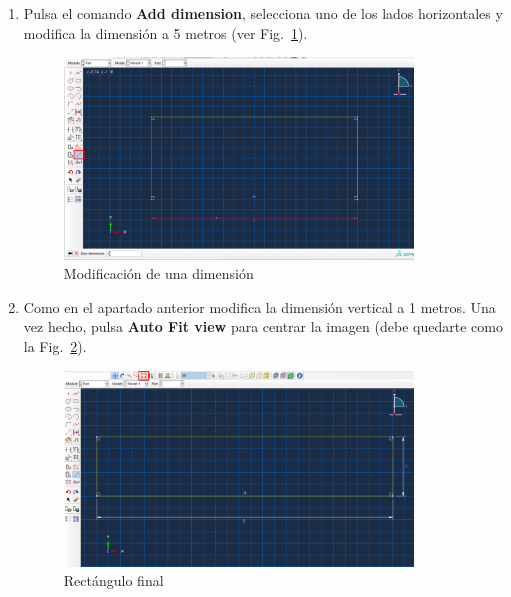 \begin{enumerate}
\begin{enumerate}
  \item Pulsa el comando \textbf{Add dimension}, selecciona uno de los
    lados horizontales y modifica la dimensión a 5 metros (ver
    Fig.~\ref{figu06}).
    \begin{figure}[H]
      \begin{center}
        \includegraphics[width=0.875\textwidth]{./body/images/imagen06.pdf}
      \end{center}
      \caption{ Modificación de una dimensión}
      \label{figu06}
    \end{figure}

  \item Como en el apartado anterior modifica la dimensión vertical a
    1 metros. Una vez hecho, pulsa \textbf{Auto Fit view} para centrar
    la imagen (debe quedarte como la Fig.~\ref{figu07}).
    \begin{figure}[H]
      \begin{center}
        \includegraphics[width=0.875\textwidth]{./body/images/imagen07.pdf}
      \end{center}
      \caption{Rectángulo final}
      \label{figu07}
    \end{figure}


\end{enumerate}
\end{enumerate}
